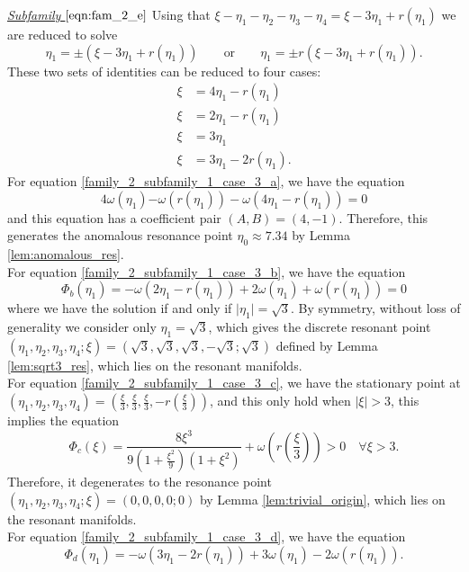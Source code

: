 \documentclass[reqno,english,11pt]{amsart}
\theoremstyle{definition}
\numberwithin{equation}{section}
\begin{document}
\noindent
{\it \underline{Subfamily $\eqref{eqn:fam_2_e}$}}
Using that $\xi-\eta_1-\eta_2-\eta_3-\eta_4=\xi-3\eta_1+r(\eta_1)$ we are reduced to solve
$$\eta_1=\pm \left(\xi-3\eta_1+r(\eta_1)\right)\qquad \text{or}\qquad \eta_1=\pm r(\xi-3\eta_1+r(\eta_1)).$$
These two sets of identities can be reduced to four cases:
\begin{subequations}
    \begin{align}
         \xi&=4\eta_1-r(\eta_1) \tag{a} \label{family_2_subfamily_1_case_3_a}
  \\
  \xi&=2\eta_1-r(\eta_1) \tag{b} \label{family_2_subfamily_1_case_3_b}
 \\
  \xi&=3\eta_1 \tag{c} \label{family_2_subfamily_1_case_3_c}
 \\
   \xi&= 3\eta_1-2r(\eta_1). \tag{d} \label{family_2_subfamily_1_case_3_d}
    \end{align} 
\end{subequations}
For equation \eqref{family_2_subfamily_1_case_3_a}, we have the equation 
$$4\omega(\eta_1) \mathbf{-} \omega(r(\eta_1)) - \omega(4\eta_1 - r(\eta_1)) = 0$$
and this equation has a coefficient pair $(A,B)=(4,-1)$. Therefore, this generates the anomalous resonance point $\eta_0 \approx 7.34$ by Lemma \ref{lem:anomalous_res}.
\\
\noindent
For equation \eqref{family_2_subfamily_1_case_3_b}, we have the equation
$$\Phi_b(\eta_1)=-\omega(2\eta_1-r(\eta_1))+2\omega(\eta_1)+\omega(r(\eta_1))=0$$
where we have the solution if and only if $\vert \eta_1\vert=\sqrt{3}$. By symmetry, without loss of generality we consider only $\eta_1=\sqrt{3}$, which gives the discrete resonant point $(\eta_1,\eta_2,\eta_3,\eta_4;\xi)=(\sqrt{3},\sqrt{3},\sqrt{3},-\sqrt{3};\sqrt{3})$ defined by Lemma \ref{lem:sqrt3_res}, which lies on the resonant manifolds.
\\
\noindent
For equation \eqref{family_2_subfamily_1_case_3_c},  we have the stationary point at $(\eta_1,\eta_2,\eta_3,\eta_4)=(\frac{\xi}{3},\frac{\xi}{3},\frac{\xi}{3},-r(\frac{\xi}{3}))$, and this only hold when $\vert \xi\vert >3$, this implies the equation
$$\Phi_c (\xi)=\frac{8\xi^3}{9(1+\frac{\xi^2}{9})(1+\xi^2)}+\omega(r(\frac{\xi}{3}))> 0\quad \forall \xi> 3.$$
Therefore, it degenerates to the resonance point $(\eta_1,\eta_2,\eta_3,\eta_4;\xi)=(0,0,0,0;0)$  by Lemma \ref{lem:trivial_origin}, which lies on the resonant manifolds.
\\
\noindent
For equation \eqref{family_2_subfamily_1_case_3_d}, we have the equation
$$\Phi_d(\eta_1)=-\omega(3\eta_1-2r(\eta_1))+3\omega(\eta_1)-2\omega(r(\eta_1)).$$
\end{document}

